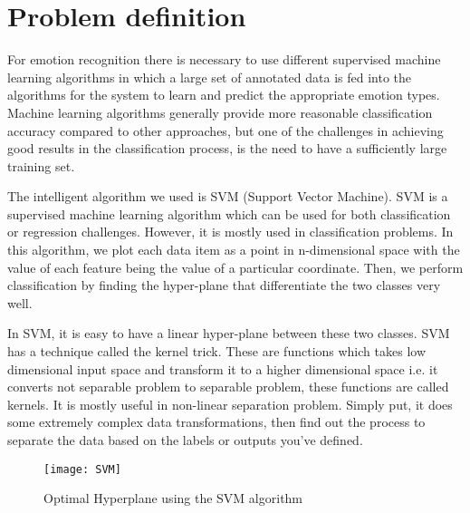 \documentclass[runningheads,a4paper,11pt]{report}
\begin{document}
\section{Problem definition}
\label{section:problemDefinition}

	For emotion recognition there is necessary to use different supervised machine learning algorithms in which a large set of annotated data is fed into the algorithms for the system to learn and predict the appropriate emotion types.  Machine learning algorithms generally provide more reasonable classification accuracy compared to other approaches, but one of the challenges in achieving good results in the classification process, is the need to have a sufficiently large training set.
    
	The intelligent algorithm we used is SVM (Support Vector Machine).
    SVM is a supervised machine learning algorithm which can be used for both classification or regression challenges. However,  it is mostly used in classification problems. In this algorithm, we plot each data item as a point in n-dimensional space with the value of each feature being the value of a particular coordinate. Then, we perform classification by finding the hyper-plane that differentiate the two classes very well.
    
    In SVM, it is easy to have a linear hyper-plane between these two classes.  SVM has a technique called the kernel trick. These are functions which takes low dimensional input space and transform it to a higher dimensional space i.e. it converts not separable problem to separable problem, these functions are called kernels. It is mostly useful in non-linear separation problem. Simply put, it does some extremely complex data transformations, then find out the process to separate the data based on the labels or outputs you’ve defined. \cite{Ray17}
    \begin{figure}
    	\centerline{\texttt{[image: SVM]}}
   		\caption{Optimal Hyperplane using the SVM algorithm}
    \end{figure}
    
\end{document}
